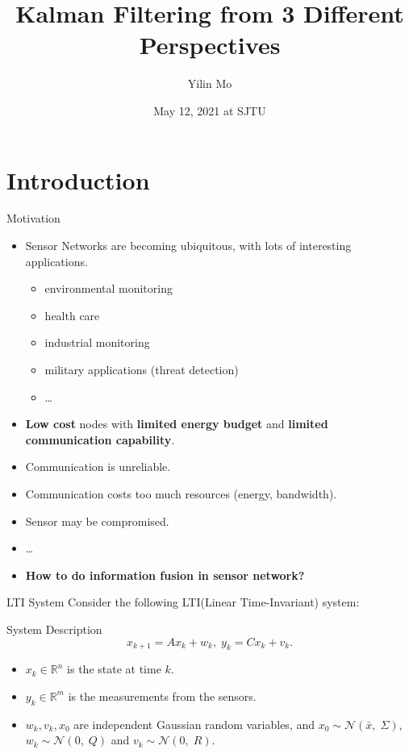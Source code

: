 \documentclass[10pt]{beamer}
\title[Kalman Filter]{Kalman Filtering from 3 Different Perspectives}
\author[Yilin Mo]{Yilin Mo}
\institute[Tsinghua]{Department of Automation, Tsinghua University}
\date[May 12, 2021]{May 12, 2021 at SJTU}
\DeclareMathOperator{\1}{\textbf{1}}
\begin{document}
\begin{frame}
  \titlepage
\end{frame}

\frame{\tableofcontents}

\section{Introduction}
\begin{frame}{Motivation}
  \begin{itemize}
    \item Sensor Networks are becoming ubiquitous, with lots of interesting applications.
      \begin{itemize}
	\item environmental monitoring
	\item health care
	\item industrial monitoring
	\item military applications (threat detection)
	\item \ldots
      \end{itemize}
    \item {\bf Low cost} nodes with {\bf limited energy budget} and {\bf limited communication capability}.
    \item Communication is unreliable. 
    \item Communication costs too much resources (energy, bandwidth). 
    \item Sensor may be compromised.
    \item \ldots
    \item \bf How to do information fusion in sensor network?
  \end{itemize}
\end{frame}

\begin{frame}{LTI System}
  Consider the following LTI(Linear Time-Invariant) system:
  \begin{block}{System Description}
    \begin{displaymath}
      x_{k+1} = Ax_k +  w_k,\; y_{k} = C x_k + v_k.
    \end{displaymath}
  \end{block}
  \begin{itemize}
    \item $x_k \in \mathbb R^n$ is the state at time $k$.
    \item  $y_k \in \mathbb R^m$ is the measurements from the sensors. 
    \item $w_k,v_k,x_0$ are independent Gaussian random variables, and $x_0 \sim \mathcal N(\bar x,\;\Sigma)$, $w_k \sim \mathcal N(0,\;Q)$ and $v_k \sim \mathcal N(0,\;R)$. 
  \end{itemize}
\end{frame}
\end{document}

